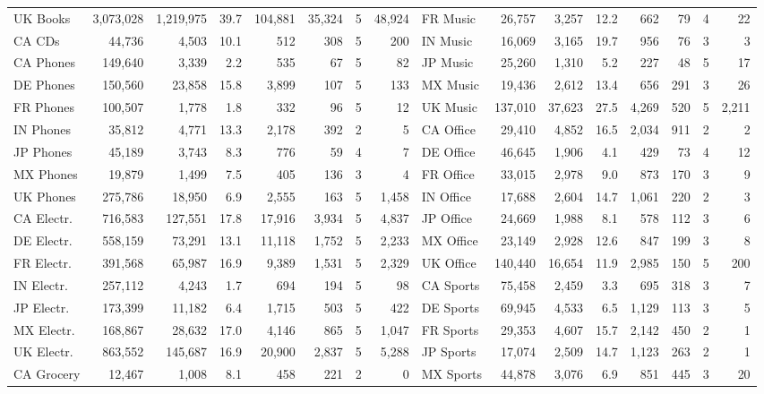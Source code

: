 \begin{table}[H]
\begin{tabular}{lrrrrrcr@{\hspace{10pt}}lrrrrrcr}
UK Books & 3,073,028 & 1,219,975 & 39.7 & 104,881 & 35,324 & 5 & 48,924 & FR Music & 26,757 & 3,257 & 12.2 & 662 & 79 & 4 & 22 \\
CA CDs & 44,736 & 4,503 & 10.1 & 512 & 308 & 5 & 200 & IN Music & 16,069 & 3,165 & 19.7 & 956 & 76 & 3 & 3 \\
CA Phones & 149,640 & 3,339 & 2.2 & 535 & 67 & 5 & 82 & JP Music & 25,260 & 1,310 & 5.2 & 227 & 48 & 5 & 17 \\
DE Phones & 150,560 & 23,858 & 15.8 & 3,899 & 107 & 5 & 133 & MX Music & 19,436 & 2,612 & 13.4 & 656 & 291 & 3 & 26 \\
FR Phones & 100,507 & 1,778 & 1.8 & 332 & 96 & 5 & 12 & UK Music & 137,010 & 37,623 & 27.5 & 4,269 & 520 & 5 & 2,211 \\
IN Phones & 35,812 & 4,771 & 13.3 & 2,178 & 392 & 2 & 5 & CA Office & 29,410 & 4,852 & 16.5 & 2,034 & 911 & 2 & 2 \\
JP Phones & 45,189 & 3,743 & 8.3 & 776 & 59 & 4 & 7 & DE Office & 46,645 & 1,906 & 4.1 & 429 & 73 & 4 & 12 \\
MX Phones & 19,879 & 1,499 & 7.5 & 405 & 136 & 3 & 4 & FR Office & 33,015 & 2,978 & 9.0 & 873 & 170 & 3 & 9 \\
UK Phones & 275,786 & 18,950 & 6.9 & 2,555 & 163 & 5 & 1,458 & IN Office & 17,688 & 2,604 & 14.7 & 1,061 & 220 & 2 & 3 \\
CA Electr. & 716,583 & 127,551 & 17.8 & 17,916 & 3,934 & 5 & 4,837 & JP Office & 24,669 & 1,988 & 8.1 & 578 & 112 & 3 & 6 \\
DE Electr. & 558,159 & 73,291 & 13.1 & 11,118 & 1,752 & 5 & 2,233 & MX Office & 23,149 & 2,928 & 12.6 & 847 & 199 & 3 & 8 \\
FR Electr. & 391,568 & 65,987 & 16.9 & 9,389 & 1,531 & 5 & 2,329 & UK Office & 140,440 & 16,654 & 11.9 & 2,985 & 150 & 5 & 200 \\
IN Electr. & 257,112 & 4,243 & 1.7 & 694 & 194 & 5 & 98 & CA Sports & 75,458 & 2,459 & 3.3 & 695 & 318 & 3 & 7 \\
JP Electr. & 173,399 & 11,182 & 6.4 & 1,715 & 503 & 5 & 422 & DE Sports & 69,945 & 4,533 & 6.5 & 1,129 & 113 & 3 & 5 \\
MX Electr. & 168,867 & 28,632 & 17.0 & 4,146 & 865 & 5 & 1,047 & FR Sports & 29,353 & 4,607 & 15.7 & 2,142 & 450 & 2 & 1 \\
UK Electr. & 863,552 & 145,687 & 16.9 & 20,900 & 2,837 & 5 & 5,288 & JP Sports & 17,074 & 2,509 & 14.7 & 1,123 & 263 & 2 & 1 \\
CA Grocery & 12,467 & 1,008 & 8.1 & 458 & 221 & 2 & 0 & MX Sports & 44,878 & 3,076 & 6.9 & 851 & 445 & 3 & 20 \\

\end{tabular}
\end{table}
